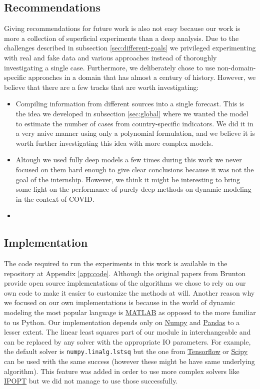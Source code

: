 \documentclass[12pt, letterpaper]{article}
\begin{document}
\subsection{Recommendations}

Giving recommendations for future work is also not easy because our work is more a collection of superficial experiments than a deep analysis. 
Due to the challenges described in subsection \ref{sec:different-goals} we privileged experimenting with real and fake data and various approaches instead of thoroughly investigating a single case. 
Furthermore, we deliberately chose to use non-domain-specific approaches in a domain that has almost a century of history.
However, we believe that there are a few tracks that are worth investigating:

\begin{itemize}
	\item Compiling information from different sources into a single forecast. This is the idea we developed in subsection \ref{sec:global} where we wanted the model to estimate the number of cases from country-specific indicators. 
	We did it in a very naive manner using only a polynomial formulation, and we believe it is worth further investigating this idea with more complex models. 
	\item Altough we used fully deep models a few times during this work we never focused on them hard enough to give clear conclusions because it was not the goal of the internship. However, we think it might be interesting to bring some light on the performance of purely deep methods on dynamic modeling in the context of COVID.
	\item 

\end{itemize}

\subsection{Implementation}

The code required to run the experiments in this work is available in the repository at Appendix \ref{app:code}. Although the original papers from Brunton \cite{sindy, sindy2} provide open source implementations of the algorithms we chose to rely on our own code to make it easier to customize the methods at will. 
Another reason why we focused on our own implementations is because in the world of dynamic modeling the most popular language is \href{https://www.mathworks.com/products/matlab.html}{MATLAB} as opposed to the more familiar to us Python.
Our implementation depends only on \href{https://numpy.org/doc/stable/index.html}{Numpy} and \href{https://pandas.pydata.org/}{Pandas} to a lesser extent.
The linear least squares part of our module in interchangeable and can be replaced by any solver with the appropriate IO parameters. 
For example, the default solver is \texttt{numpy.linalg.lstsq} but the one from \href{https://www.tensorflow.org/}{Tensorflow} or \href{https://www.scipy.org/}{Scipy} can be used with the same success (however these might be have same underlying algorithm).
This feature was added in order to use more complex solvers like \href{https://github.com/coin-or/Ipopt}{IPOPT} but we did not manage to use those successfully.
\end{document}
